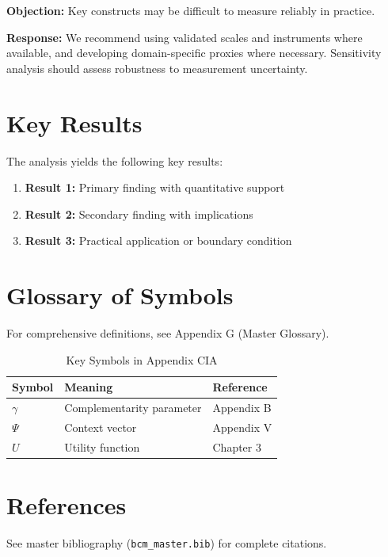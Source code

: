 \textbf{Objection:} Key constructs may be difficult to measure reliably in
practice.

\textbf{Response:} We recommend using validated scales and instruments where
available, and developing domain-specific proxies where necessary. Sensitivity
analysis should assess robustness to measurement uncertainty.





\section{Key Results}
\label{sec:cia-results}

The analysis yields the following key results:

\begin{enumerate}
    \item \textbf{Result 1:} Primary finding with quantitative support
    \item \textbf{Result 2:} Secondary finding with implications
    \item \textbf{Result 3:} Practical application or boundary condition
\end{enumerate}

\section{Glossary of Symbols}
\label{sec:cia-glossary}

For comprehensive definitions, see Appendix G (Master Glossary).

\begin{table}[htbp]
\centering
\caption{Key Symbols in Appendix CIA}
\begin{tabular}{lll}
\toprule
\textbf{Symbol} & \textbf{Meaning} & \textbf{Reference} \\
\midrule
$\gamma$ & Complementarity parameter & Appendix B \\
$\Psi$ & Context vector & Appendix V \\
$U$ & Utility function & Chapter 3 \\
\bottomrule
\end{tabular}
\end{table}


\section{References}
\label{sec:cia-references}

See master bibliography (\texttt{bcm\_master.bib}) for complete citations.

\nocite{bcm_master}

